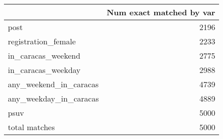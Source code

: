 \begin{tabular}{lr}
\toprule
{} &  Num exact matched by var \\
\midrule
post                   &                      2196 \\
registration\_female    &                      2233 \\
in\_caracas\_weekend     &                      2775 \\
in\_caracas\_weekday     &                      2988 \\
any\_weekend\_in\_caracas &                      4739 \\
any\_weekday\_in\_caracas &                      4889 \\
psuv                   &                      5000 \\
total matches          &                      5000 \\
\bottomrule
\end{tabular}
